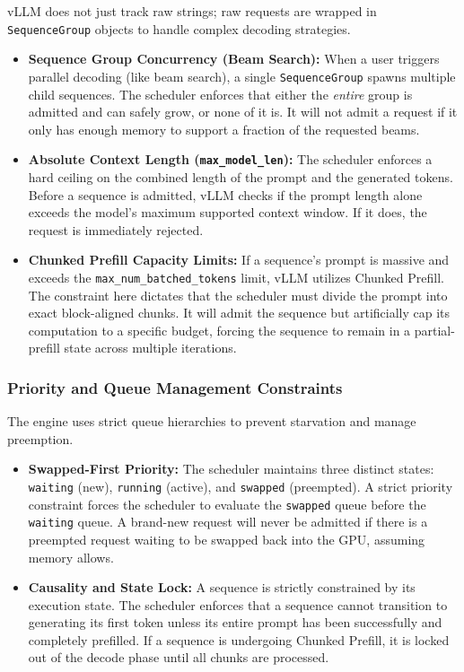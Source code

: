\documentclass[11pt]{article}
\begin{document}
vLLM does not just track raw strings; raw requests are wrapped in \texttt{SequenceGroup} objects to handle complex decoding strategies.
\begin{itemize}
    \item \textbf{Sequence Group Concurrency (Beam Search):} When a user triggers parallel decoding (like beam search), a single \texttt{SequenceGroup} spawns multiple child sequences. The scheduler enforces that either the \textit{entire} group is admitted and can safely grow, or none of it is. It will not admit a request if it only has enough memory to support a fraction of the requested beams.
    \item \textbf{Absolute Context Length (\texttt{max\_model\_len}):} The scheduler enforces a hard ceiling on the combined length of the prompt and the generated tokens. Before a sequence is admitted, vLLM checks if the prompt length alone exceeds the model's maximum supported context window. If it does, the request is immediately rejected.
    \item \textbf{Chunked Prefill Capacity Limits:} If a sequence's prompt is massive and exceeds the \texttt{max\_num\_batched\_tokens} limit, vLLM utilizes Chunked Prefill. The constraint here dictates that the scheduler must divide the prompt into exact block-aligned chunks. It will admit the sequence but artificially cap its  computation to a specific budget, forcing the sequence to remain in a partial-prefill state across multiple iterations.
\end{itemize}

\subsubsection{Priority and Queue Management Constraints}
\label{subsec:priority_queue_constraints}

The engine uses strict queue hierarchies to prevent starvation and manage preemption.
\begin{itemize}
    \item \textbf{Swapped-First Priority:} The scheduler maintains three distinct states: \texttt{waiting} (new), \texttt{running} (active), and \texttt{swapped} (preempted). A strict priority constraint forces the scheduler to evaluate the \texttt{swapped} queue before the \texttt{waiting} queue. A brand-new request will never be admitted if there is a preempted request waiting to be swapped back into the GPU, assuming memory allows.
    \item \textbf{Causality and State Lock:} A sequence is strictly constrained by its execution state. The scheduler enforces that a sequence cannot transition to generating its first  token unless its entire prompt has been successfully and completely prefilled. If a sequence is undergoing Chunked Prefill, it is locked out of the decode phase until all chunks are processed.
\end{itemize}
\end{document}
